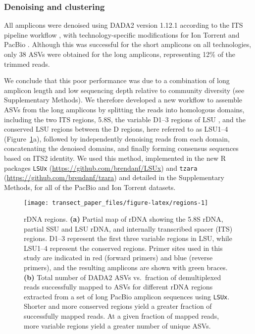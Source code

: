\documentclass[
  12pt,
]{article}
\begin{document}
\hypertarget{denoising-and-clustering}{%
\subsubsection{Denoising and clustering}\label{denoising-and-clustering}}

All amplicons were denoised using DADA2 version 1.12.1 according to the ITS pipeline workflow \autocite{callahan2016,callahan2020}, with technology-specific modifications for Ion Torrent \autocite{callahan2020b} and PacBio \autocite{callahan2019}.
Although this was successful for the short amplicons on all technologies, only 38 ASVs were obtained for the long amplicons, representing 12\% of the trimmed reads.

We conclude that this poor performance was due to a combination of long amplicon length and low sequencing depth relative to community diversity (see Supplementary Methods).
We therefore developed a new workflow to assemble ASVs from the long amplicons by splitting the reads into homologous domains, including the two ITS regions, 5.8S, the variable D1--3 regions of LSU \autocite{michot1984}, and the conserved LSU regions between the D regions, here referred to as LSU1--4 (Figure~\ref{fig:regions}a), followed by independently denoising reads from each domain, concatenating the denoised domains, and finally forming consensus sequences based on ITS2 identity.
We used this method, implemented in the new R packages \texttt{LSUx} (\url{https://github.com/brendanf/LSUx}) and \texttt{tzara} (\url{https://github.com/brendanf/tzara}) and detailed in the Supplementary Methods, for all of the PacBio and Ion Torrent datasets.





\begin{figure}

{\centering \texttt{[image: transect\_paper\_files/figure-latex/regions-1]} 

}

\caption[rDNA regions]{rDNA regions. \textbf{(a)} Partial map of rDNA showing the 5.8S rDNA, partial SSU and LSU rDNA, and internally transcribed spacer (ITS) regions. D1--3 represent the first three variable regions in LSU, while LSU1--4 represent the conserved regions. Primer sites used in this study are indicated in red (forward primers) and blue (reverse primers), and the resulting amplicons are shown with green braces. \textbf{(b)} Total number of DADA2 ASVs vs.~fraction of demultiplexed reads successfully mapped to ASVs for different rDNA regions extracted from a set of long PacBio amplicon sequences using \texttt{LSUx}. Shorter and more conserved regions yield a greater fraction of successfully mapped reads. At a given fraction of mapped reads, more variable regions yield a greater number of unique ASVs.}\label{fig:regions}
\end{figure}
\end{document}
